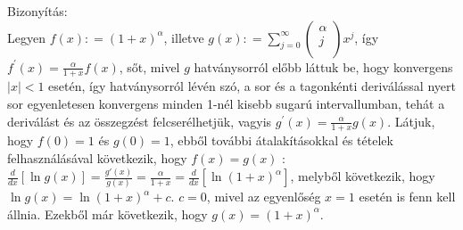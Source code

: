 \documentclass[12pt,a4paper]{scrartcl}
\newenvironment{bizonyitas}{}{}
\begin{document}
\begin{bizonyitas}

Bizonyítás:\\
Legyen \(f\left( x \right): = \left( {1 + x} \right)^{\alpha}\), illetve
\(g\left( x \right): = {\sum\limits_{j = 0}^{\infty}{\begin{pmatrix} \alpha \\ j \\ \end{pmatrix}x^{j}}}\),
így
\(f^{\prime}\left( x \right) = \frac{\alpha}{1 + x}f\left( x \right)\),
sőt, mivel \(g\) hatványsorról előbb láttuk be, hogy konvergens
\(\left| x \right| < 1\) esetén, így hatványsorról lévén szó, a sor és a
tagonkénti deriválással nyert sor egyenletesen konvergens minden 1-nél
kisebb sugarú intervallumban, tehát a deriválást és az összegzést
felcserélhetjük, vagyis
\(g^{\prime}\left( x \right) = \frac{\alpha}{1 + x}g\left( x \right)\).
Látjuk, hogy \(f\left( 0 \right) = 1\) és \(g\left( 0 \right) = 1\),
ebből további átalakításokkal és tételek felhasználásával következik,
hogy \(f\left( x \right) = g\left( x \right)\) :
\(\frac{d}{dx}\left\lbrack {\ln g\left( x \right)} \right\rbrack = \frac{g'\left( x \right)}{g\left( x \right)} = \frac{\alpha}{1 + x} = \frac{d}{dx}\left\lbrack {\ln\left( {1 + x} \right)^{\alpha}} \right\rbrack\),
melyből következik, hogy
\(\ln g\left( x \right) = \ln\left( {1 + x} \right)^{\alpha} + c\).
\(c = 0\), mivel az egyenlőség \(x = 1\) esetén is fenn kell állnia.
Ezekből már következik, hogy
\(g\left( x \right) = \left( {1 + x} \right)^{\alpha}\).

\end{bizonyitas}
\end{document}
